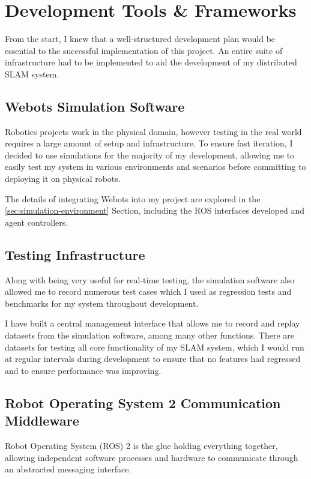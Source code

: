 \section{Development Tools \& Frameworks}
\label{sec:development-tools-and-frameworks}
From the start, I knew that a well-structured development plan would be essential to the successful implementation of this project. An entire suite of infrastructure had to be implemented to aid the development of my distributed SLAM system.

\subsection{Webots Simulation Software}
\label{sec:webots-simulator}

Robotics projects work in the physical domain, however testing in the real world requires a large amount of setup and infrastructure. To ensure fast iteration, I decided to use simulations for the majority of my development, allowing me to easily test my system in various environments and scenarios before committing to deploying it on physical robots.

The details of integrating Webots into my project are explored in the \autoref{sec:simulation-environment} Section, including the ROS interfaces developed and agent controllers.

\subsection{Testing Infrastructure}
\label{sec:testing-infrastructure}

Along with being very useful for real-time testing, the simulation software also allowed me to record numerous test cases which I used as regression tests and benchmarks for my system throughout development.

I have built a central management interface that allows me to record and replay datasets from the simulation software, among many other functions. There are datasets for testing all core functionality of my SLAM system, which I would run at regular intervals during development to ensure that no features had regressed and to ensure performance was improving.

\subsection{Robot Operating System 2 Communication Middleware}
\label{sec:ros-2}
Robot Operating System (ROS) 2 is the glue holding everything together, allowing independent software processes and hardware to communicate through an abstracted messaging interface.

